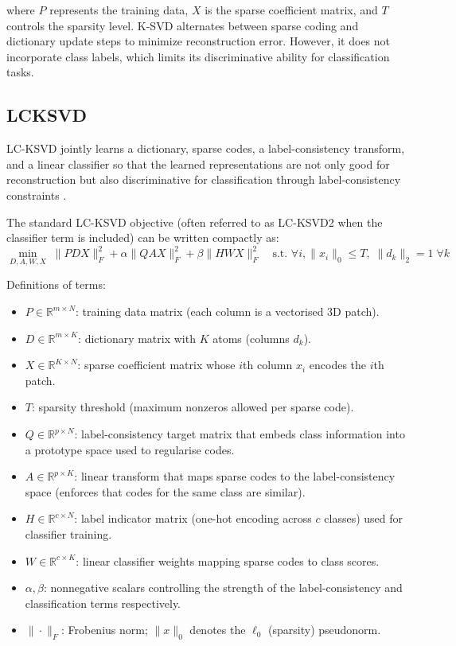 where $P$ represents the training data, $X$ is the sparse coefficient matrix, and $T$ controls the sparsity level.
K-SVD alternates between sparse coding and dictionary update steps to minimize reconstruction error.
However, it does not incorporate class labels, which limits its discriminative ability for classification tasks. \cite{ksvd}

\subsection{LCKSVD}
LC-KSVD jointly learns a dictionary, sparse codes, a label-consistency transform, and a linear classifier so that the learned
representations are not only good for reconstruction but also discriminative for classification through label-consistency constraints \cite{jiang2013lcksvd}.

The standard LC-KSVD objective (often referred to as LC-KSVD2 when the classifier term is included) can be written compactly as:
\begin{equation}
\label{eq:lcksvd_obj}
\min_{D,A,W,X} \; \|P  D X\|_F^2 + \alpha \|Q  A X\|_F^2 + \beta \|H  W X\|_F^2 \quad \text{s.t. } \forall i, \|x_i\|_0 \le T, \; \|d_k\|_2 = 1 \; \forall k
\end{equation}

Definitions of terms:
\begin{itemize}
    \item $P \in \mathbb{R}^{m\times N}$: training data matrix (each column is a vectorised 3D patch).
    \item $D \in \mathbb{R}^{m\times K}$: dictionary matrix with $K$ atoms (columns $d_k$).
    \item $X \in \mathbb{R}^{K\times N}$: sparse coefficient matrix whose $i$th column $x_i$ encodes the $i$th patch.
    \item $T$: sparsity threshold (maximum nonzeros allowed per sparse code).
    \item $Q \in \mathbb{R}^{p\times N}$: label-consistency target matrix that embeds class information into a prototype space used to regularise codes.
    \item $A \in \mathbb{R}^{p\times K}$: linear transform that maps sparse codes to the label-consistency space (enforces that codes for the same class are similar).
    \item $H \in \mathbb{R}^{c\times N}$: label indicator matrix (one-hot encoding across $c$ classes) used for classifier training.
    \item $W \in \mathbb{R}^{c\times K}$: linear classifier weights mapping sparse codes to class scores.
    \item $\alpha,\beta$: nonnegative scalars controlling the strength of the label-consistency and classification terms respectively.
    \item $\|\cdot\|_F$: Frobenius norm; $\|x\|_0$ denotes the $\ell_0$ (sparsity) pseudonorm.
\end{itemize}

